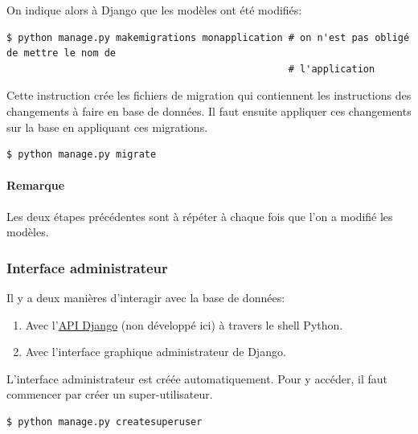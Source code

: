 \documentclass[a4paper, 10pt]{article}
\begin{document}
On indique alors à Django que les modèles ont été modifiés:
\begin{verbatim}
$ python manage.py makemigrations monapplication # on n'est pas obligé de mettre le nom de
                                                 # l'application
\end{verbatim}

Cette instruction crée les fichiers de migration qui contiennent les instructions des changements à faire en base de données. Il faut ensuite appliquer ces changements sur la base en appliquant ces migrations.

\begin{verbatim}
$ python manage.py migrate
\end{verbatim}

\paragraph{Remarque} Les deux étapes précédentes sont à répéter à chaque fois que l'on a modifié les modèles.

\subsubsection{Interface administrateur}
Il y a deux manières d'interagir avec la base de données:
\begin{enumerate}
    \item Avec l'\href{https://docs.djangoproject.com/fr/2.2/topics/db/queries/}{API Django} (non développé ici) à travers le shell Python.
    \item Avec l'interface graphique administrateur de Django.
\end{enumerate}

L'interface administrateur est créée automatiquement. Pour y accéder, il faut commencer par créer un super-utilisateur.

\begin{verbatim}
$ python manage.py createsuperuser
\end{verbatim}
\end{document}
